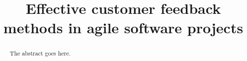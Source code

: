 \documentclass[conference]{IEEEtran}
\begin{document}
%
\title{Effective customer feedback methods in agile software projects}

\author{
}


% 








\maketitle


\begin{abstract}
The abstract goes here.
\end{abstract}
\end{document}
